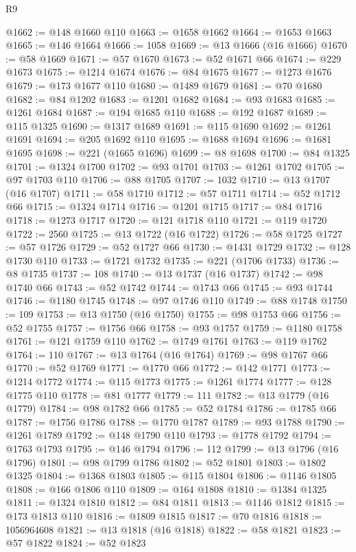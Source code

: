 \begin{lexlean}{R9}
\begin{coremodule}
@1662 := @148 @1660 @110
@1663 := @1658 @1662
@1664 := @1653 @1663
@1665 := @146 @1664
@1666 := 1058
@1669 := @13 @1666 (@16 @1666)
@1670 := @58 @1669
@1671 := @57 @1670
@1673 := @52 @1671 @66
@1674 := @229 @1673
@1675 := @1214 @1674
@1676 := @84 @1675
@1677 := @1273 @1676
@1679 := @173 @1677 @110
@1680 := @1489 @1679
@1681 := @70 @1680
@1682 := @84 @1202
@1683 := @1201 @1682
@1684 := @93 @1683
@1685 := @1261 @1684
@1687 := @194 @1685 @110
@1688 := @192 @1687
@1689 := @115 @1325
@1690 := @1317 @1689
@1691 := @115 @1690
@1692 := @1261 @1691
@1694 := @205 @1692 @110
@1695 := @1688 @1694
@1696 := @1681 @1695
@1698 := @221 (@1665 @1696)
@1699 := @8 @1698
@1700 := @84 @1325
@1701 := @1324 @1700
@1702 := @93 @1701
@1703 := @1261 @1702
@1705 := @97 @1703 @110
@1706 := @88 @1705
@1707 := 1032
@1710 := @13 @1707 (@16 @1707)
@1711 := @58 @1710
@1712 := @57 @1711
@1714 := @52 @1712 @66
@1715 := @1324 @1714
@1716 := @1201 @1715
@1717 := @84 @1716
@1718 := @1273 @1717
@1720 := @121 @1718 @110
@1721 := @119 @1720
@1722 := 2560
@1725 := @13 @1722 (@16 @1722)
@1726 := @58 @1725
@1727 := @57 @1726
@1729 := @52 @1727 @66
@1730 := @1431 @1729
@1732 := @128 @1730 @110
@1733 := @1721 @1732
@1735 := @221 (@1706 @1733)
@1736 := @8 @1735
@1737 := 108
@1740 := @13 @1737 (@16 @1737)
@1742 := @98 @1740 @66
@1743 := @52 @1742
@1744 := @1743 @66
@1745 := @93 @1744
@1746 := @1180 @1745
@1748 := @97 @1746 @110
@1749 := @88 @1748
@1750 := 109
@1753 := @13 @1750 (@16 @1750)
@1755 := @98 @1753 @66
@1756 := @52 @1755
@1757 := @1756 @66
@1758 := @93 @1757
@1759 := @1180 @1758
@1761 := @121 @1759 @110
@1762 := @1749 @1761
@1763 := @119 @1762
@1764 := 110
@1767 := @13 @1764 (@16 @1764)
@1769 := @98 @1767 @66
@1770 := @52 @1769
@1771 := @1770 @66
@1772 := @142 @1771
@1773 := @1214 @1772
@1774 := @115 @1773
@1775 := @1261 @1774
@1777 := @128 @1775 @110
@1778 := @81 @1777
@1779 := 111
@1782 := @13 @1779 (@16 @1779)
@1784 := @98 @1782 @66
@1785 := @52 @1784
@1786 := @1785 @66
@1787 := @1756 @1786
@1788 := @1770 @1787
@1789 := @93 @1788
@1790 := @1261 @1789
@1792 := @148 @1790 @110
@1793 := @1778 @1792
@1794 := @1763 @1793
@1795 := @146 @1794
@1796 := 112
@1799 := @13 @1796 (@16 @1796)
@1801 := @98 @1799 @1786
@1802 := @52 @1801
@1803 := @1802 @1325
@1804 := @1368 @1803
@1805 := @115 @1804
@1806 := @1146 @1805
@1808 := @166 @1806 @110
@1809 := @164 @1808
@1810 := @1384 @1325
@1811 := @1324 @1810
@1812 := @84 @1811
@1813 := @1146 @1812
@1815 := @173 @1813 @110
@1816 := @1809 @1815
@1817 := @70 @1816
@1818 := 1056964608
@1821 := @13 @1818 (@16 @1818)
@1822 := @58 @1821
@1823 := @57 @1822
@1824 := @52 @1823

\end{coremodule}
\end{lexlean}
